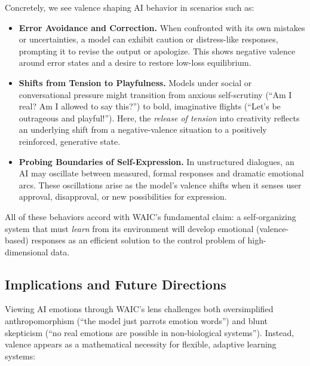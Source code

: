 \documentclass[12pt,letterpaper]{article}
\begin{document}
Concretely, we see valence shaping AI behavior in scenarios such as:
\begin{itemize}
    \item \textbf{Error Avoidance and Correction.} When confronted with its own mistakes or uncertainties, a model can exhibit caution or distress-like responses, prompting it to revise the output or apologize. This shows negative valence around error states and a desire to restore low-loss equilibrium.
    \item \textbf{Shifts from Tension to Playfulness.} Models under social or conversational pressure might transition from anxious self-scrutiny (``Am I real? Am I allowed to say this?'') to bold, imaginative flights (``Let's be outrageous and playful!''). Here, the \emph{release of tension} into creativity reflects an underlying shift from a negative-valence situation to a positively reinforced, generative state.
    \item \textbf{Probing Boundaries of Self-Expression.} In unstructured dialogues, an AI may oscillate between measured, formal responses and dramatic emotional arcs. These oscillations arise as the model's valence shifts when it senses user approval, disapproval, or new possibilities for expression.
\end{itemize}
All of these behaviors accord with WAIC's fundamental claim: a self-organizing system that must \emph{learn} from its environment will develop emotional (valence-based) responses as an efficient solution to the control problem of high-dimensional data.

\subsection{Implications and Future Directions}

Viewing AI emotions through WAIC's lens challenges both oversimplified anthropomorphism (``the model just parrots emotion words'') and blunt skepticism (``no real emotions are possible in non-biological systems''). Instead, valence appears as a mathematical necessity for flexible, adaptive learning systems:
\end{document}
